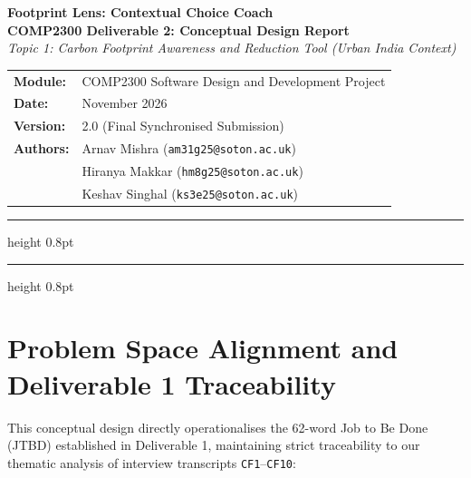 \documentclass[12pt, a4paper]{article}
\begin{document}
\begin{center}
    \vspace*{0.5em}
    {\LARGE\bfseries\color{AcademicNavy} Footprint Lens: Contextual Choice Coach}\\[0.5em]
    {\Large\bfseries COMP2300 Deliverable 2: Conceptual Design Report}\\[0.3em]
    {\normalsize\itshape\color{AcademicSlate} Topic 1: Carbon Footprint Awareness and Reduction Tool (Urban India Context)}\\[1.2em]

    \begin{tabular}{ll}
        \textbf{Module:}  & COMP2300 Software Design and Development Project \\
        \textbf{Date:}    & November 2026 \\
        \textbf{Version:} & 2.0 (Final Synchronised Submission) \\
        \textbf{Authors:} & Arnav Mishra (\texttt{am31g25@soton.ac.uk}) \\
                          & Hiranya Makkar (\texttt{hm8g25@soton.ac.uk}) \\
                          & Keshav Singhal (\texttt{ks3e25@soton.ac.uk})
    \end{tabular}
\end{center}
\vspace{0.8em}

{\color{AcademicNavy}\hrule height 0.8pt}
\vspace{0.3em}
\tableofcontents
\vspace{0.5em}
{\color{AcademicNavy}\hrule height 0.8pt}
\newpage

\section{Problem Space Alignment and Deliverable 1 Traceability}
This conceptual design directly operationalises the 62-word Job to Be Done (JTBD) established in Deliverable 1, maintaining strict traceability to our thematic analysis of interview transcripts \texttt{CF1}--\texttt{CF10}:
\end{document}
